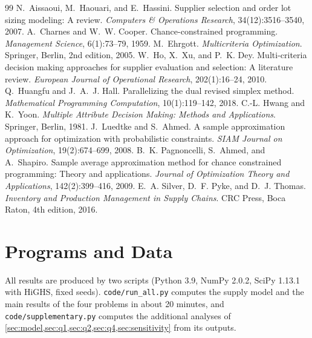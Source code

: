 \documentclass[11pt,a4paper]{article}
\begin{document}
\begingroup
\small
\begin{thebibliography}{99}
 N.~Aissaoui, M.~Haouari, and E.~Hassini. Supplier selection and order lot sizing modeling: A review. \emph{Computers \& Operations Research}, 34(12):3516--3540, 2007.
 A.~Charnes and W.~W. Cooper. Chance-constrained programming. \emph{Management Science}, 6(1):73--79, 1959.
 M.~Ehrgott. \emph{Multicriteria Optimization}. Springer, Berlin, 2nd edition, 2005.
 W.~Ho, X.~Xu, and P.~K. Dey. Multi-criteria decision making approaches for supplier evaluation and selection: A literature review. \emph{European Journal of Operational Research}, 202(1):16--24, 2010.
 Q.~Huangfu and J.~A.~J. Hall. Parallelizing the dual revised simplex method. \emph{Mathematical Programming Computation}, 10(1):119--142, 2018.
 C.-L. Hwang and K.~Yoon. \emph{Multiple Attribute Decision Making: Methods and Applications}. Springer, Berlin, 1981.
 J.~Luedtke and S.~Ahmed. A sample approximation approach for optimization with probabilistic constraints. \emph{SIAM Journal on Optimization}, 19(2):674--699, 2008.
 B.~K. Pagnoncelli, S.~Ahmed, and A.~Shapiro. Sample average approximation method for chance constrained programming: Theory and applications. \emph{Journal of Optimization Theory and Applications}, 142(2):399--416, 2009.
 E.~A. Silver, D.~F. Pyke, and D.~J. Thomas. \emph{Inventory and Production Management in Supply Chains}. CRC Press, Boca Raton, 4th edition, 2016.
\end{thebibliography}
\endgroup

\appendix
\section{Programs and Data}
All results are produced by two scripts (Python 3.9, NumPy 2.0.2, SciPy 1.13.1 with HiGHS, fixed seeds).
\texttt{code/run\_all.py} computes the supply model and the main results of the four problems in about 20 minutes, and \texttt{code/supplementary.py} computes the additional analyses of \cref{sec:model,sec:q1,sec:q2,sec:q4,sec:sensitivity} from its outputs.
\end{document}
